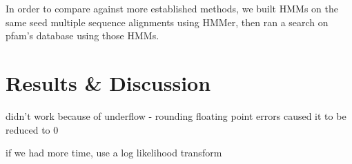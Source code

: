 \documentclass{article}
\begin{document}
In order to compare against more established methods, we built HMMs on the same seed multiple sequence alignments using HMMer, then ran a search on pfam's database using those HMMs. 


\section{Results \& Discussion}
didn't work because of underflow - rounding floating point errors caused it to be reduced to 0

if we had more time, use a log likelihood transform 


% 
% 
% 



% 
\end{document}
